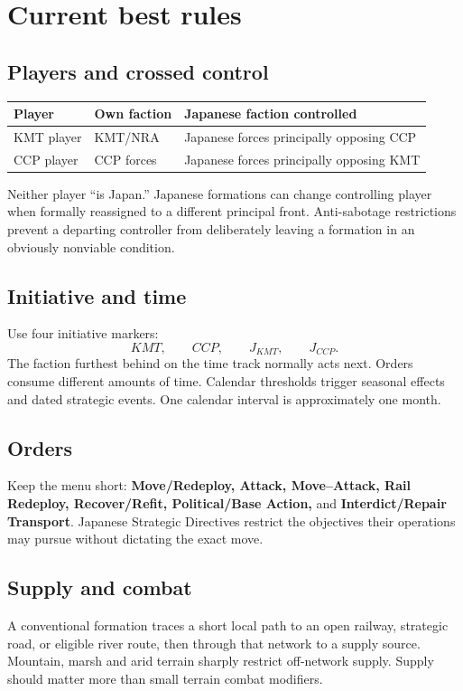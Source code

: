 \documentclass[11pt]{article}
\begin{document}
\section{Current best rules}

\subsection{Players and crossed control}
\begin{center}
\begin{tabular}{lll}
\toprule Player & Own faction & Japanese faction controlled \\\midrule
KMT player & KMT/NRA & Japanese forces principally opposing CCP \\
CCP player & CCP forces & Japanese forces principally opposing KMT \\
\bottomrule
\end{tabular}
\end{center}
Neither player ``is Japan.'' Japanese formations can change controlling player when formally reassigned to a different principal front. Anti-sabotage restrictions prevent a departing controller from deliberately leaving a formation in an obviously nonviable condition.

\subsection{Initiative and time}
Use four initiative markers:
\[
KMT,\qquad CCP,\qquad J_{KMT},\qquad J_{CCP}.
\]
The faction furthest behind on the time track normally acts next. Orders consume different amounts of time. Calendar thresholds trigger seasonal effects and dated strategic events. One calendar interval is approximately one month.

\subsection{Orders}
Keep the menu short: \textbf{Move/Redeploy, Attack, Move--Attack, Rail Redeploy, Recover/Refit, Political/Base Action,} and \textbf{Interdict/Repair Transport}. Japanese Strategic Directives restrict the objectives their operations may pursue without dictating the exact move.

\subsection{Supply and combat}
A conventional formation traces a short local path to an open railway, strategic road, or eligible river route, then through that network to a supply source. Mountain, marsh and arid terrain sharply restrict off-network supply. Supply should matter more than small terrain combat modifiers.
\end{document}

